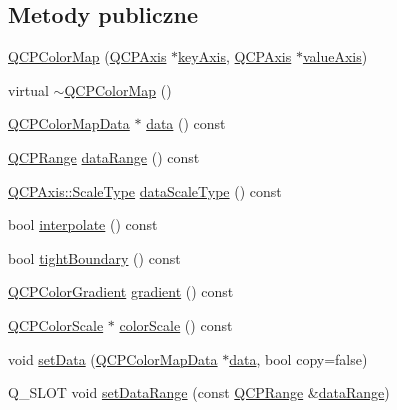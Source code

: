 \subsection*{Metody publiczne}
\begin{DoxyCompactItemize}
\item 
\hyperlink{class_q_c_p_color_map_aa37e976d2ee1e2be6c4cd88a64b36215}{Q\+C\+P\+Color\+Map} (\hyperlink{class_q_c_p_axis}{Q\+C\+P\+Axis} $\ast$\hyperlink{class_q_c_p_abstract_plottable_a72c7a09c22963f2c943f07112b311103}{key\+Axis}, \hyperlink{class_q_c_p_axis}{Q\+C\+P\+Axis} $\ast$\hyperlink{class_q_c_p_abstract_plottable_a3106f9d34d330a6097a8ec5905e5b519}{value\+Axis})
\item 
virtual \hyperlink{class_q_c_p_color_map_ac8a952a40fed62dcee33405b0f4d47ad}{$\sim$\+Q\+C\+P\+Color\+Map} ()
\item 
\hyperlink{class_q_c_p_color_map_data}{Q\+C\+P\+Color\+Map\+Data} $\ast$ \hyperlink{class_q_c_p_color_map_a3ae12c9ce842352037cd20ea5267414f}{data} () const 
\item 
\hyperlink{class_q_c_p_range}{Q\+C\+P\+Range} \hyperlink{class_q_c_p_color_map_a37cc8e821e070697e15652f6419fab48}{data\+Range} () const 
\item 
\hyperlink{class_q_c_p_axis_a36d8e8658dbaa179bf2aeb973db2d6f0}{Q\+C\+P\+Axis\+::\+Scale\+Type} \hyperlink{class_q_c_p_color_map_a5ffc703dc603c4fd942f36ea51b8c48d}{data\+Scale\+Type} () const 
\item 
bool \hyperlink{class_q_c_p_color_map_a39019675a7ad00efad7212b96c0ccc95}{interpolate} () const 
\item 
bool \hyperlink{class_q_c_p_color_map_aa1d9aa8db73a5942881f6f6c5afdbb0f}{tight\+Boundary} () const 
\item 
\hyperlink{class_q_c_p_color_gradient}{Q\+C\+P\+Color\+Gradient} \hyperlink{class_q_c_p_color_map_a9f967a971474e32345290b79cf107809}{gradient} () const 
\item 
\hyperlink{class_q_c_p_color_scale}{Q\+C\+P\+Color\+Scale} $\ast$ \hyperlink{class_q_c_p_color_map_a6bd82e0b042a2ec4d64f40853a3b05e3}{color\+Scale} () const 
\item 
void \hyperlink{class_q_c_p_color_map_a5a23e133a20c4ccad35fd32e6c0f9809}{set\+Data} (\hyperlink{class_q_c_p_color_map_data}{Q\+C\+P\+Color\+Map\+Data} $\ast$\hyperlink{class_q_c_p_color_map_a3ae12c9ce842352037cd20ea5267414f}{data}, bool copy=false)
\item 
Q\+\_\+\+S\+L\+OT void \hyperlink{class_q_c_p_color_map_a980b42837821159786a85b4b7dcb8774}{set\+Data\+Range} (const \hyperlink{class_q_c_p_range}{Q\+C\+P\+Range} \&\hyperlink{class_q_c_p_color_map_a37cc8e821e070697e15652f6419fab48}{data\+Range})

\end{DoxyCompactItemize}
